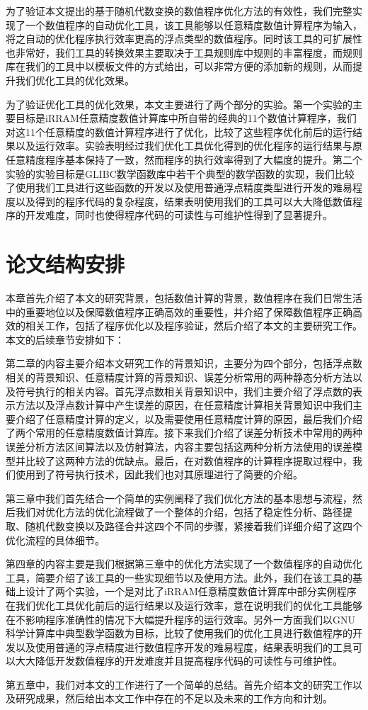 为了验证本文提出的基于随机代数变换的数值程序优化方法的有效性，我们完整实现了一个数值程序的自动优化工具，该工具能够以任意精度数值计算程序为输入，将之自动的优化程序执行效率更高的浮点类型的数值程序。同时该工具的可扩展性也非常好，我们工具的转换效果主要取决于工具规则库中规则的丰富程度，而规则库在我们的工具中以模板文件的方式给出，可以非常方便的添加新的规则，从而提升我们优化工具的优化效果。

为了验证优化工具的优化效果，本文主要进行了两个部分的实验。第一个实验的主要目标是iRRAM任意精度数值计算库\cite{10.1007/3-540-45335-0_14}中所自带的经典的11个数值计算程序，我们对这11个任意精度的数值计算程序进行了优化，比较了这些程序优化前后的运行结果以及运行效率。实验表明经过我们优化工具优化得到的优化程序的运行结果与原任意精度程序基本保持了一致，然而程序的执行效率得到了大幅度的提升。第二个实验的实验目标是GLIBC数学函数库中若干个典型的数学函数的实现，我们比较了使用我们工具进行这些函数的开发以及使用普通浮点精度类型进行开发的难易程度以及得到的程序代码的复杂程度，结果表明使用我们的工具可以大大降低数值程序的开发难度，同时也使得程序代码的可读性与可维护性得到了显著提升。

\section{论文结构安排}

本章首先介绍了本文的研究背景，包括数值计算的背景，数值程序在我们日常生活中的重要地位以及保障数值程序正确高效的重要性，并介绍了保障数值程序正确高效的相关工作，包括了程序优化以及程序验证，然后介绍了本文的主要研究工作。本文的后续章节安排如下：

第二章的内容主要介绍本文研究工作的背景知识，主要分为四个部分，包括浮点数相关的背景知识、任意精度计算的背景知识、误差分析常用的两种静态分析方法以及符号执行的相关内容。首先浮点数相关背景知识中，我们主要介绍了浮点数的表示方法以及浮点数计算中产生误差的原因，在任意精度计算相关背景知识中我们主要介绍了任意精度计算的定义，以及需要使用任意精度计算的原因，最后我们介绍了两个常用的任意精度数值计算库。接下来我们介绍了误差分析技术中常用的两种误差分析方法区间算法以及仿射算法，内容主要包括这两种分析方法使用的误差模型并比较了这两种方法的优缺点。最后，在对数值程序的计算程序提取过程中，我们使用到了符号执行技术，因此我们也对其原理进行了简要的介绍。

第三章中我们首先结合一个简单的实例阐释了我们优化方法的基本思想与流程，然后我们对优化方法的优化流程做了一个整体的介绍，包括了稳定性分析、路径提取、随机代数变换以及路径合并这四个不同的步骤，紧接着我们详细介绍了这四个优化流程的具体细节。

第四章的内容主要是我们根据第三章中的优化方法实现了一个数值程序的自动优化工具，简要介绍了该工具的一些实现细节以及使用方法。此外，我们在该工具的基础上设计了两个实验，一个是对比了iRRAM任意精度数值计算库中部分实例程序在我们优化工具优化前后的运行结果以及运行效率，意在说明我们的优化工具能够在不影响程序准确性的情况下大幅提升程序的运行效率。另外一方面我们以GNU科学计算库中典型数学函数为目标，比较了使用我们的优化工具进行数值程序的开发以及使用普通的浮点精度进行数值程序开发的难易程度，结果表明我们的工具可以大大降低开发数值程序的开发难度并且提高程序代码的可读性与可维护性。

第五章中，我们对本文的工作进行了一个简单的总结。首先介绍本文的研究工作以及研究成果，然后给出本文工作中存在的不足以及未来的工作方向和计划。
